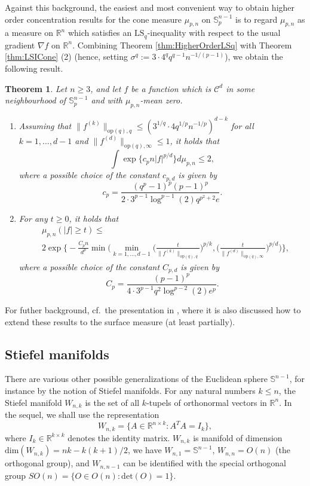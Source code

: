 \documentclass[a4paper,12pt]{amsart}
\numberwithin{equation}{section}
\newtheorem{satz}{Theorem}[section]
\theoremstyle{remark}
\def\R{{\mathbb R}}
\def\S{{\mathbb S}}
\begin{document}
Against this background, the easiest and most convenient way to obtain higher order concentration results for the cone measure $\mu_{p,n}$ on $\S_p^{n-1}$ is to regard $\mu_{p,n}$ as a measure on $\R^n$ which satisfies an $\mathrm{LS}_q$-inequality with respect to the usual gradient $\nabla f$ on $\R^n$. Combining Theorem \ref{thm:HigherOrderLSq} with Theorem \ref{thm:LSICone} (2) (hence, setting $\sigma^q := 3 \cdot 4^q q^{q-1} n^{-1/(p-1)}$), we obtain the following result.

\begin{satz}\label{thm:HOSph}
	Let $n \ge 3$, and let $f$ be a function which is $\mathcal{C}^d$ in some neighbourhood of $\S_p^{n-1}$ and with $\mu_{p,n}$-mean zero.
	\begin{enumerate}
		\item Assuming that $\lVert f^{(k)} \rVert_{\mathrm{op}(q),q} \le (3^{1/q} \cdot 4 q^{1/p} n^{-1/p})^{d-k}$ for all $k=1,\ldots,d-1$ and $\lVert f^{(d)} \rVert_{\mathrm{op}(q),\infty} \le 1$, it holds that
		\[
		\int \exp\Big\{c_pn |f|^{p/d} \Big\} d\mu_{p,n} \le 2,
		\]
		where a possible choice of the constant $c_{p,d}$ is given by
		\[
		c_p = \frac{(q^p-1)^p(p-1)^p}{2 \cdot 3^{p-1}\log^{p-1}(2)q^{p^2+2}e}.
		\]
		\item For any $t\ge 0$, it holds that
		\begin{align*}
			&\mu_{p,n}(|f| \ge t)\le\\
			&2 \exp\Big\{- \frac{C_pn}{d^p} \min\Big(\min_{k=1, \ldots,d-1} \Big(\frac{t}{\lVert f^{(k)} \rVert_{\mathrm{op}(q),q}}\Big)^{p/k}, \Big(\frac{t}{\lVert f^{(d)} \rVert_{\mathrm{op}(q),\infty}}\Big)^{p/d}\Big)\Big\},
		\end{align*}
		where a possible choice of the constant $C_{p,d}$ is given by
		\[
		C_p = \frac{(p-1)^p}{4 \cdot 3^{p-1}q^2\log^{p-2}(2) e^p}.
		\]
	\end{enumerate}
\end{satz}

For futher background, cf.\ the presentation in \cite{GS24}, where it is also discussed how to extend these results to the surface measure (at least partially).

\subsection{Stiefel manifolds}

There are various other possible generalizations of the Euclidean sphere $\S^{n-1}$, for instance by the notion of Stiefel manifolds. For any natural numbers $k \le n$, the Stiefel manifold $W_{n,k}$ is the set of all $k$-tupels of orthonormal vectors in $\mathbb{R}^n$. In the sequel, we shall use the representation
\[
W_{n,k} = \{A \in \mathbb{R}^{n \times k} \colon A^TA = I_k \},
\]
where $I_k \in \mathbb{R}^{k \times k}$ denotes the identity matrix. $W_{n,k}$ is manifold of dimension $\mathrm{dim}(W_{n,k}) = nk - k(k+1)/2$, we have $W_{n,1} = \S^{n-1}$, $W_{n,n} = O(n)$ (the orthogonal group), and $W_{n,n-1}$ can be identified with the special orthogonal group $SO(n) = \{O \in O(n) \colon \mathrm{det}(O) = 1\}$.
\end{document}
